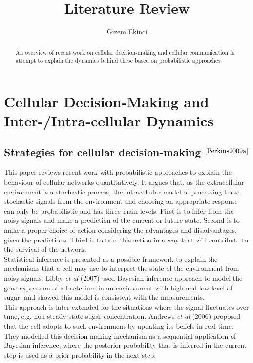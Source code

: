 \documentclass[]{article}
\title{Literature Review}
\author{Gizem Ekinci}
\begin{document}
\maketitle

\begin{abstract}
An overview of recent work on cellular decision-making and cellular communication in attempt to explain the dynamics behind these based on probabilistic approaches.
\end{abstract}

\section{Cellular Decision-Making and Inter-/Intra-cellular Dynamics}
\subsection{Strategies for cellular decision-making $^{\cite{Perkins2009a}}$}
This paper reviews recent work with probabilistic approaches to explain the behaviour of cellular networks quantitatively. It argues that, as the extracellular environment is a stochastic process, the intracellular model of processing these stochastic signals from the environment and choosing an appropriate response can only be probabilistic and has three main levels. First is to infer from the noisy signals and make a prediction of the current or future state. Second is to make a proper choice of action considering the advantages and disadvantages, given the predictions. Third is to take this action in a way that will contribute to the survival of the network.\\
Statistical inference is presented as a possible framework to explain the mechanisms that a cell may use to interpret the state of the environment from noisy signals. Libby \textit{et al} (2007) used Bayesian inference approach to model the gene expression of a bacterium in an environment with high and low level of sugar, and showed this model is consistent with the measurements.\\
This approach is later extended for the situations where the signal fluctuates over time, e.g. non steady-state sugar concentration. Andrews \textit{et al} (2006) proposed that the cell adopts to such environment by updating its beliefs in real-time. They modelled this decision-making mechanism as a sequential application of Bayesian inference, where the posterior probability that is inferred in the current step is used as a prior probability in the next step.\\
\end{document}
